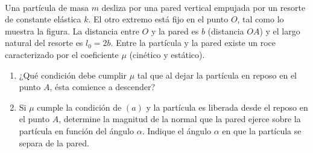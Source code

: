 \documentclass[
	spanish, %
	letterpaper, oneside
]{article}
\begin{document}
\templatePagecfg








\\

Una partícula de masa $m$ desliza por una pared vertical empujada por un resorte de constante elástica
$k$. El otro extremo está fijo en el punto $O$, tal como lo muestra la figura. La distancia entre $O$ y la pared
es $b$ (distancia $OA$) y el largo natural del resorte es $l_0 = 2b$. Entre la partícula y la pared existe un roce
caracterizado por el coeficiente $\mu$ (cinético y estático).

\begin{enumerate}[label=\alph*)]

    \item  ¿Qué condición debe cumplir $\mu$ tal que al dejar la partícula en reposo en el punto $A$, ésta comience a descender?

    \item Si $\mu$ cumple la condición de $(a)$ y la partícula es liberada desde el reposo en el punto $A$, determine la magnitud de la normal que la pared ejerce sobre la partícula en función del ángulo $\alpha$. Indique el ángulo $\alpha$ en que la partícula se separa de la pared.

\end{enumerate}
\end{document}
